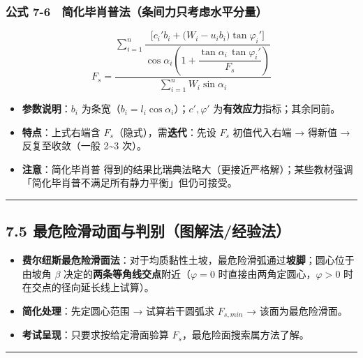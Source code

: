 \documentclass[
]{article}
\providecommand{\tightlist}{%
  \setlength{\itemsep}{0pt}\setlength{\parskip}{0pt}}
\begin{document}
\subsubsection{公式
7-6　简化毕肖普法（条间力只考虑水平分量）}\label{ux516cux5f0f-7-6-ux7b80ux5316ux6bd5ux8096ux666eux6cd5ux6761ux95f4ux529bux53eaux8003ux8651ux6c34ux5e73ux5206ux91cf}

\[F_s=\frac{\sum\limits_{i=1}^{n}\dfrac{\Big[c_i' b_i+\big(W_i-u_i b_i\big)\tan\varphi_i'\Big]}{\cos\alpha_i\left(1+\dfrac{\tan\alpha_i\,\tan\varphi_i'}{F_s}\right)}}{\sum\limits_{i=1}^{n}W_i\sin\alpha_i}\]

\begin{itemize}
\tightlist
\item
  \textbf{参数说明}：\(b_i\)
  为条宽（\(b_i=l_i\cos\alpha_i\)）；\(c',\varphi'\)
  为\textbf{有效应力}指标；其余同前。
\item
  \textbf{特点}：上式右端含 \(F_s\)（隐式），需\textbf{迭代}：先设
  \(F_s\) 初值代入右端 → 得新值 → 反复至收敛（一般 2\textasciitilde3
  次）。
\item
  \textbf{注意}：简化毕肖普
  得到的结果比瑞典法略大（更接近严格解）；某些教材强调「简化毕肖普不满足所有静力平衡」但仍可接受。
\end{itemize}

\begin{center}\rule{0.5\linewidth}{0.5pt}\end{center}

\subsection{7.5
最危险滑动面与判别（图解法/经验法）}\label{ux6700ux5371ux9669ux6ed1ux52a8ux9762ux4e0eux5224ux522bux56feux89e3ux6cd5ux7ecfux9a8cux6cd5}

\begin{itemize}
\tightlist
\item
  \textbf{费尔纽斯最危险滑面法}：对于均质黏性土坡，最危险滑弧通过\textbf{坡脚}；圆心位于由坡角
  \(\beta\) 决定的\textbf{两条等角线交点}附近（\(\varphi=0\)
  时直接由两角定圆心，\(\varphi>0\) 时在交点的径向延长线上试算）。
\item
  \textbf{简化处理}：先定圆心范围 → 试算若干圆弧求 \(F_{s,min}\) →
  该面为最危险滑面。
\item
  \textbf{考试呈现}：只要求按给定滑面验算
  \(F_s\)，最危险面搜索属方法了解。
\end{itemize}

\begin{center}\rule{0.5\linewidth}{0.5pt}\end{center}
\end{document}
